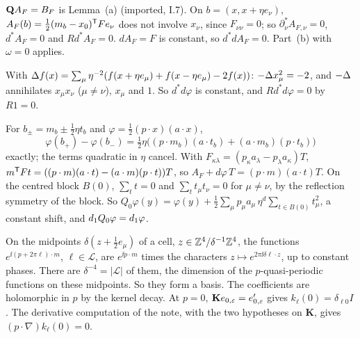 \begin{detail}\label{d11a:C7}
\begin{step}[(c)]
$\mathbf Q A_F=B_F$ is Lemma~(a) (imported, I.7). On $b=(x,x+\eta e_\nu)$, $A_F(b)=\frac12(m_b-x_0)^{\sf T}Fe_\nu$ does not involve $x_\nu$, since $F_{\nu\nu}=0$; so $\partial^*_\nu A_{F,\nu}=0$, $d^*A_F=0$ and $Rd^*A_F=0$. $dA_F=F$ is constant, so $d^*dA_F=0$. Part~(b) with $\omega=0$ applies.
\end{step}
\begin{step}
With $\Delta f(x)=\sum_\mu\eta^{-2}(f(x+\eta e_\mu)+f(x-\eta e_\mu)-2f(x))$: $-\Delta x_\mu^2=-2$, and $-\Delta$ annihilates $x_\mu x_\nu$ ($\mu\ne\nu$), $x_\mu$ and $1$. So $d^*d\varphi$ is constant, and $Rd^*d\varphi=0$ by $R1=0$.
\end{step}
\begin{step}
For $b_\pm=m_b\pm\frac12\eta t_b$ and $\varphi=\frac12(p\cdot x)(a\cdot x)$,
\[
\varphi(b_+)-\varphi(b_-)=\tfrac12\eta\big((p\cdot m_b)(a\cdot t_b)+(a\cdot m_b)(p\cdot t_b)\big)
\]
exactly; the terms quadratic in $\eta$ cancel. With $F_{\kappa\lambda}=(p_\kappa a_\lambda-p_\lambda a_\kappa)T$, $m^{\sf T}Ft=((p\cdot m)(a\cdot t)-(a\cdot m)(p\cdot t))T$, so $A_F+d\varphi\,T=(p\cdot m)(a\cdot t)T$. On the centred block $B(0)$, $\sum_tt=0$ and $\sum_tt_\mu t_\nu=0$ for $\mu\ne\nu$, by the reflection symmetry of the block. So $Q_0\varphi(y)=\varphi(y)+\frac12\sum_\mu p_\mu a_\mu\,\eta^d\sum_{t\in B(0)}t_\mu^2$, a constant shift, and $d_1 Q_0\varphi=d_1\varphi$.
\end{step}
\end{detail}

\begin{detail}\label{d11a:C8}
On the midpoints $\delta(z+\frac12e_\mu)$ of a cell, $z\in\mathbb Z^4/\delta^{-1}\mathbb Z^4$, the functions $e^{\ii(p+2\pi\ell)\cdot m}$, $\ell\in\mathcal L$, are $e^{\ii p\cdot m}$ times the characters $z\mapsto e^{2\pi\ii\delta\ell\cdot z}$, up to constant phases. There are $\delta^{-4}=|\mathcal L|$ of them, the dimension of the $p$-quasi-periodic functions on these midpoints. So they form a basis. The coefficients are holomorphic in $p$ by the kernel decay. At $p=0$, $\mathbf Ke_{0,\varepsilon}=e'_{0,\varepsilon}$ gives $k_\ell(0)=\delta_{\ell0}I$. The derivative computation of the note, with the two hypotheses on $\mathbf K$, gives $(p\cdot\nabla)k_\ell(0)=0$.
\end{detail}

